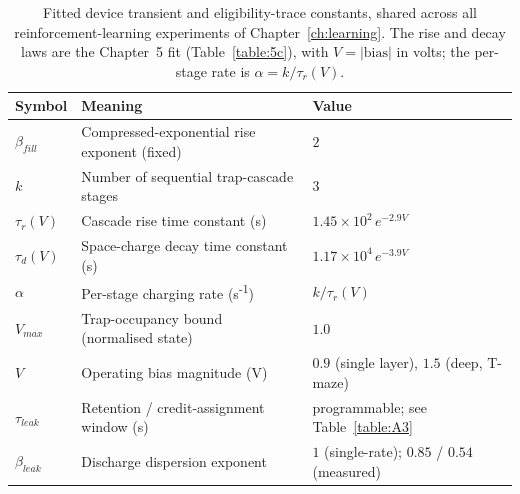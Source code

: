 \begin{table}[htbp!]
    \caption[Device-transient and eligibility-trace constants.]{Fitted device
    transient and eligibility-trace constants, shared across all reinforcement-learning
    experiments of Chapter~\ref{ch:learning}. The rise and decay laws are the Chapter~5 fit
    (Table~\ref{table:5c}), with $V=|\text{bias}|$ in volts; the per-stage rate is
    $\alpha = k/\tau_r(V)$.}
    \begin{center}
    \small
    \begin{tabularx}{\textwidth}{@{}l X l@{}}
    \toprule
    Symbol & Meaning & Value \\
    \midrule
    $\beta_{fill}$   & Compressed-exponential rise exponent (fixed)          & $2$ \\
    $k$              & Number of sequential trap-cascade stages              & $3$ \\
    $\tau_r(V)$      & Cascade rise time constant (s)                        & $1.45\times10^{2}\,e^{-2.9V}$ \\
    $\tau_d(V)$      & Space-charge decay time constant (s)                  & $1.17\times10^{4}\,e^{-3.9V}$ \\
    $\alpha$         & Per-stage charging rate (s\textsuperscript{-1})       & $k/\tau_r(V)$ \\
    $V_{max}$        & Trap-occupancy bound (normalised state)               & $1.0$ \\
    $V$              & Operating bias magnitude (V)                          & $0.9$ (single layer), $1.5$ (deep, T-maze) \\
    $\tau_{leak}$    & Retention / credit-assignment window (s)              & programmable; see Table~\ref{table:A3} \\
    $\beta_{leak}$   & Discharge dispersion exponent                         & $1$ (single-rate); $0.85$ / $0.54$ (measured) \\
    \bottomrule
    \end{tabularx}
    \label{table:A1}
    \end{center}
    \vspace*{-\baselineskip}
\end{table}

